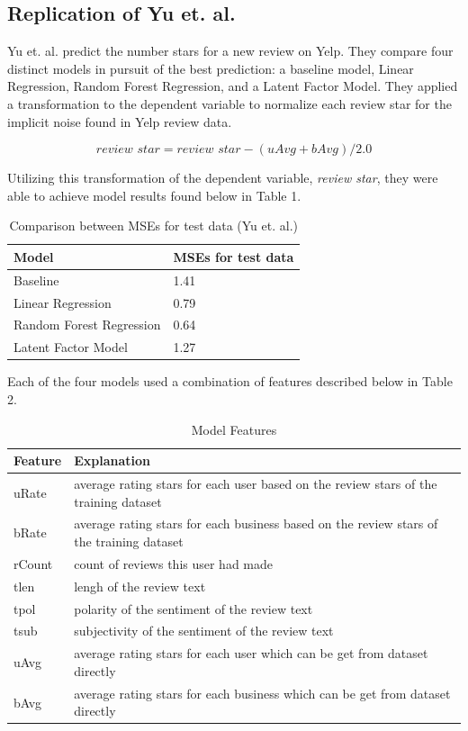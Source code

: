 \documentclass[12pt]{article}
\begin{document}
\subsection{Replication of Yu et. al.}

Yu et. al. \cite{yu2015restaurants} predict the number stars for a new review on Yelp.
They compare four distinct models in pursuit of the best prediction: a baseline model,
Linear Regression, Random Forest Regression, and a Latent Factor Model. They applied a
transformation to the dependent variable to normalize each review star for the implicit
noise found in Yelp review data.

\[
\textit{review star} = \textit{review star} - (uAvg + bAvg)/2.0
\]

Utilizing this transformation of the dependent variable, \textit{review star}, they were
able to achieve model results found below in Table 1.

\begin{table}[h]
  \caption{\label{tab:rep-models}Comparison between MSEs for test data (Yu et. al.)}
  \begin{tabular}{|l|l|}
    \hline
    \textbf{Model} & \textbf{MSEs for test data} \\
    \hline
    Baseline & 1.41 \\
    \hline
    Linear Regression & 0.79 \\
    \hline
    Random Forest Regression & 0.64 \\
    \hline
    Latent Factor Model & 1.27 \\
    \hline
  \end{tabular}
\end{table}

Each of the four models used a combination of features described below in Table 2.

\begin{table}[h]
  \caption{\label{tab:features}Model Features}
\begin{tabular}{| l | l |}
  \hline
  \textbf{Feature} & \textbf{Explanation} \\
  \hline
  uRate & average rating stars for each user based on the review stars of the
          training dataset \\
  \hline
  bRate & average rating stars for each business based on the review stars of the training 
          dataset \\
  \hline
  rCount & count of reviews this user had made \\
  \hline
  tlen & lengh of the review text \\
  \hline
  tpol & polarity of the sentiment of the review text \\
  \hline
  tsub & subjectivity of the sentiment of the review text \\
  \hline
  uAvg & average rating stars for each user which can be get from dataset directly \\
  \hline
  bAvg & average rating stars for each business which can be get from dataset directly \\
  \hline
\end{tabular}
\end{table}
\end{document}
